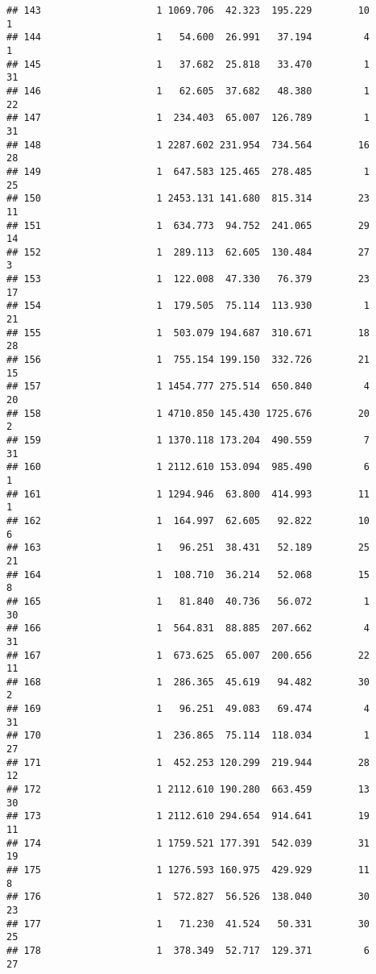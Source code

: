 \documentclass[
]{article}
\begin{document}
\begin{verbatim}
## 143                    1 1069.706  42.323  195.229        10         1
## 144                    1   54.600  26.991   37.194         4         1
## 145                    1   37.682  25.818   33.470         1        31
## 146                    1   62.605  37.682   48.380         1        22
## 147                    1  234.403  65.007  126.789         1        31
## 148                    1 2287.602 231.954  734.564        16        28
## 149                    1  647.583 125.465  278.485         1        25
## 150                    1 2453.131 141.680  815.314        23        11
## 151                    1  634.773  94.752  241.065        29        14
## 152                    1  289.113  62.605  130.484        27         3
## 153                    1  122.008  47.330   76.379        23        17
## 154                    1  179.505  75.114  113.930         1        21
## 155                    1  503.079 194.687  310.671        18        28
## 156                    1  755.154 199.150  332.726        21        15
## 157                    1 1454.777 275.514  650.840         4        20
## 158                    1 4710.850 145.430 1725.676        20         2
## 159                    1 1370.118 173.204  490.559         7        31
## 160                    1 2112.610 153.094  985.490         6         1
## 161                    1 1294.946  63.800  414.993        11         1
## 162                    1  164.997  62.605   92.822        10         6
## 163                    1   96.251  38.431   52.189        25        21
## 164                    1  108.710  36.214   52.068        15         8
## 165                    1   81.840  40.736   56.072         1        30
## 166                    1  564.831  88.885  207.662         4        31
## 167                    1  673.625  65.007  200.656        22        11
## 168                    1  286.365  45.619   94.482        30         2
## 169                    1   96.251  49.083   69.474         4        31
## 170                    1  236.865  75.114  118.034         1        27
## 171                    1  452.253 120.299  219.944        28        12
## 172                    1 2112.610 190.280  663.459        13        30
## 173                    1 2112.610 294.654  914.641        19        11
## 174                    1 1759.521 177.391  542.039        31        19
## 175                    1 1276.593 160.975  429.929        11         8
## 176                    1  572.827  56.526  138.040        30        23
## 177                    1   71.230  41.524   50.331        30        25
## 178                    1  378.349  52.717  129.371         6        27

\end{verbatim}
\end{document}
